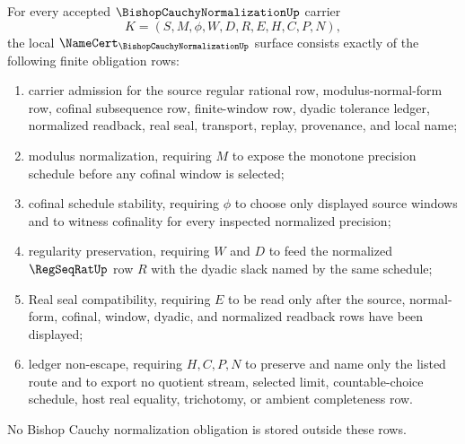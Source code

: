 \begin{theorem}
\label{thm:bishop-cauchy-normalization-namecert-obligations}
For every accepted $\BishopCauchyNormalizationUp$ carrier
$$
K=(S,M,\phi,W,D,R,E,H,C,P,N),
$$
the local $\NameCert_{\BishopCauchyNormalizationUp}$ surface consists exactly of the following finite obligation rows:
\begin{enumerate}
\item carrier admission for the source regular rational row, modulus-normal-form row, cofinal subsequence row, finite-window row, dyadic tolerance ledger, normalized readback, real seal, transport, replay, provenance, and local name;
\item modulus normalization, requiring $M$ to expose the monotone precision schedule before any cofinal window is selected;
\item cofinal schedule stability, requiring $\phi$ to choose only displayed source windows and to witness cofinality for every inspected normalized precision;
\item regularity preservation, requiring $W$ and $D$ to feed the normalized $\RegSeqRatUp$ row $R$ with the dyadic slack named by the same schedule;
\item Real seal compatibility, requiring $E$ to be read only after the source, normal-form, cofinal, window, dyadic, and normalized readback rows have been displayed;
\item ledger non-escape, requiring $H,C,P,N$ to preserve and name only the listed route and to export no quotient stream, selected limit, countable-choice schedule, host real equality, trichotomy, or ambient completeness row.
\end{enumerate}
No Bishop Cauchy normalization obligation is stored outside these rows.
\end{theorem}
